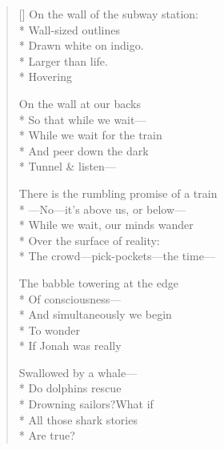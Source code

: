 \label{ch:dolphins_eels_sea_turtles}
\begin{verse}[\versewidth]
\hspace*{1\vgap} On the wall of the subway station:\\*
Wall-sized outlines\\*
Drawn white on indigo.\\*
Larger than life.\\*
Hovering

On the wall at our backs\\*
So that while we wait---\\*
While we wait for the train\\*
And peer down the dark\\*
Tunnel \& listen---

There is the rumbling promise of a train\\*
---No---it's above us, or below---\\*
While we wait, our minds wander\\*
Over the surface of reality:\\*
The crowd---pick-pockets---the time---

The babble towering at the edge\\*
Of consciousness---\\*
And simultaneously we begin\\*
To wonder\\*
If Jonah was really

Swallowed by a whale---\\*
Do dolphins rescue\\*
Drowning sailors?\qquad What if\\*
All those shark stories\\*
Are true?
\end{verse}

